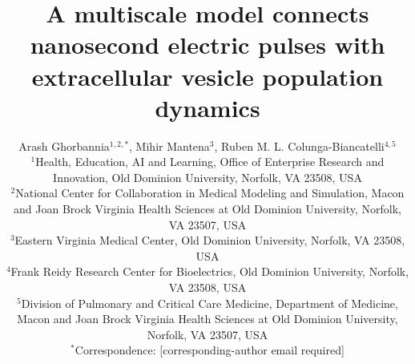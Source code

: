 \documentclass[11pt,a4paper]{article}
\title{A multiscale model connects nanosecond electric pulses with extracellular vesicle population dynamics}
\author{Arash Ghorbannia$^{1,2,*}$, Mihir Mantena$^{3}$, Ruben M. L. Colunga-Biancatelli$^{4,5}$\\[0.6em]
\small $^{1}$Health, Education, AI and Learning, Office of Enterprise Research and Innovation, Old Dominion University, Norfolk, VA 23508, USA\\
\small $^{2}$National Center for Collaboration in Medical Modeling and Simulation, Macon and Joan Brock Virginia Health Sciences at Old Dominion University, Norfolk, VA 23507, USA\\
\small $^{3}$Eastern Virginia Medical Center, Old Dominion University, Norfolk, VA 23508, USA\\
\small $^{4}$Frank Reidy Research Center for Bioelectrics, Old Dominion University, Norfolk, VA 23508, USA\\
\small $^{5}$Division of Pulmonary and Critical Care Medicine, Department of Medicine, Macon and Joan Brock Virginia Health Sciences at Old Dominion University, Norfolk, VA 23507, USA\\
\small $^{*}$Correspondence: [corresponding-author email required]}
\date{}
\begin{document}
\linenumbers
\maketitle










\end{document}
